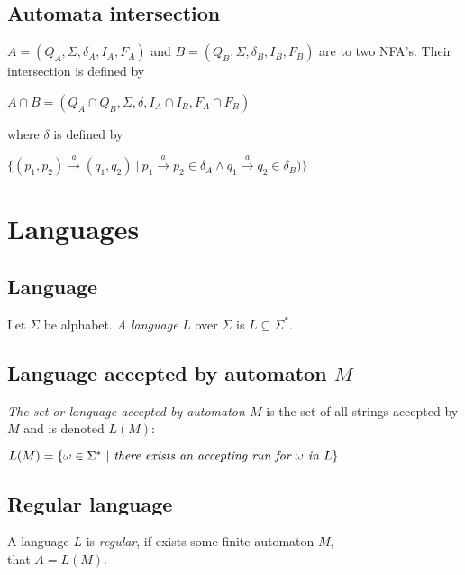 	\subsection{Automata intersection}
	\label{defAInter}
	\begin{definition}
		$A=(Q_A,\Sigma,\delta_A,I_A,F_A)$ and $B=(Q_B,\Sigma,\delta_B,I_B,F_B)$ are to two NFA's. Their intersection is defined by
		\begin{description}
			\item $A \cap B=(Q_A\cap Q_B,\Sigma,\delta,I_A\cap I_B,F_A\cap F_B)$\
		\end{description}
		where $\delta$ is defined by
		\begin{description}
			\item $\{(p_1,p_2) \xrightarrow{a} (q_1,q_2)\ |\ p_1 \xrightarrow{a} p_2 \in \delta_A \wedge q_1 \xrightarrow{a} q_2 \in \delta_B)\}$\
		\end{description}
	\end{definition}

\section{Languages}
		\subsection{Language}
		\label{defLang}
		\begin{definition}
			Let $\Sigma$ be alphabet. \emph{A language }$L$ over $\Sigma$ is $L\subseteq\Sigma^{*}$.
		\end{definition}
		\subsection{Language accepted by automaton $M$}
		\label{defLangM}
		\begin{definition}
			\emph{The set or language accepted by automaton $M$} is the set of all strings accepted by $M$ and is denoted $L(M)$:
			\begin{description*}
				\item $L(M) = \{\omega\in\Sigma^{*}\ |\ \emph{there exists an accepting run for }\omega\emph{ in }L\}$
			\end{description*}
		\end{definition}
		\subsection{Regular language}
		\begin{definition}
			A language $L$ is \emph{regular}, if exists some finite automaton $M$,\\ that $A=L(M)$.
		\end{definition}

